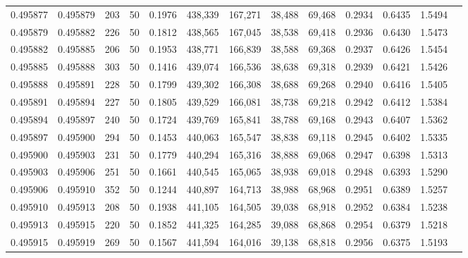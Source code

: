 \begin{tabular}{rrrrrrrrrrrrr}
0.495877 & 0.495879 &   203 &  50 &                                     0.1976 & 438,339 & 167,271 &  38,488 &  69,468 & 0.2934 & 0.6435 & 1.5494 \\
0.495879 & 0.495882 &   226 &  50 &                                     0.1812 & 438,565 & 167,045 &  38,538 &  69,418 & 0.2936 & 0.6430 & 1.5473 \\
0.495882 & 0.495885 &   206 &  50 &                                     0.1953 & 438,771 & 166,839 &  38,588 &  69,368 & 0.2937 & 0.6426 & 1.5454 \\
0.495885 & 0.495888 &   303 &  50 &                                     0.1416 & 439,074 & 166,536 &  38,638 &  69,318 & 0.2939 & 0.6421 & 1.5426 \\
0.495888 & 0.495891 &   228 &  50 &                                     0.1799 & 439,302 & 166,308 &  38,688 &  69,268 & 0.2940 & 0.6416 & 1.5405 \\
0.495891 & 0.495894 &   227 &  50 &                                     0.1805 & 439,529 & 166,081 &  38,738 &  69,218 & 0.2942 & 0.6412 & 1.5384 \\
0.495894 & 0.495897 &   240 &  50 &                                     0.1724 & 439,769 & 165,841 &  38,788 &  69,168 & 0.2943 & 0.6407 & 1.5362 \\
0.495897 & 0.495900 &   294 &  50 &                                     0.1453 & 440,063 & 165,547 &  38,838 &  69,118 & 0.2945 & 0.6402 & 1.5335 \\
0.495900 & 0.495903 &   231 &  50 &                                     0.1779 & 440,294 & 165,316 &  38,888 &  69,068 & 0.2947 & 0.6398 & 1.5313 \\
0.495903 & 0.495906 &   251 &  50 &                                     0.1661 & 440,545 & 165,065 &  38,938 &  69,018 & 0.2948 & 0.6393 & 1.5290 \\
0.495906 & 0.495910 &   352 &  50 &                                     0.1244 & 440,897 & 164,713 &  38,988 &  68,968 & 0.2951 & 0.6389 & 1.5257 \\
0.495910 & 0.495913 &   208 &  50 &                                     0.1938 & 441,105 & 164,505 &  39,038 &  68,918 & 0.2952 & 0.6384 & 1.5238 \\
0.495913 & 0.495915 &   220 &  50 &                                     0.1852 & 441,325 & 164,285 &  39,088 &  68,868 & 0.2954 & 0.6379 & 1.5218 \\
0.495915 & 0.495919 &   269 &  50 &                                     0.1567 & 441,594 & 164,016 &  39,138 &  68,818 & 0.2956 & 0.6375 & 1.5193 \\

\end{tabular}
